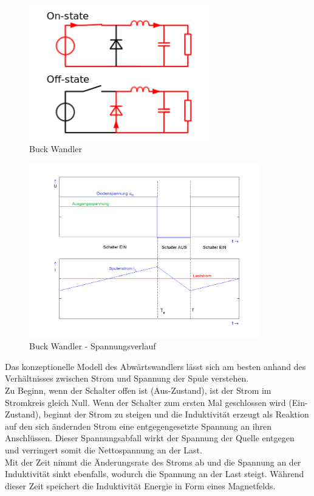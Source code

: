 \begin{figure}[H]
    \centering
    \includegraphics[width=0.7\textwidth]{resources/images/Buck_operating.svg.png}
    \caption[Buck]{Buck Wandler\cite{buck}}
    \label{fig:buck}
\end{figure}

\begin{figure}[H]
    \centering
    \includegraphics[width=0.9\textwidth]{resources/images/Tiefsetzsteller_Funktion.png}
    \caption[Buck Spannungen]{Buck Wandler - Spannungsverlauf\cite{buck2}}
    \label{fig:buck_waveforms}
\end{figure}

Das konzeptionelle Modell des Abwärtswandlers lässt sich am besten anhand des Verhältnisses zwischen Strom
und Spannung der Spule verstehen. \\
Zu Beginn, wenn der Schalter offen ist (Aus-Zustand), ist der Strom im
Stromkreis gleich Null. Wenn der Schalter zum ersten Mal geschlossen wird (Ein-Zustand), beginnt der Strom
zu steigen und die Induktivität erzeugt als Reaktion auf den sich ändernden Strom eine entgegengesetzte
Spannung an ihren Anschlüssen. Dieser Spannungsabfall wirkt der Spannung der Quelle entgegen und verringert
somit die Nettospannung an der Last. \\
Mit der Zeit nimmt die Änderungsrate des Stroms ab und die Spannung an der Induktivität sinkt ebenfalls,
wodurch die Spannung an der Last steigt. Während dieser Zeit speichert die Induktivität Energie in Form
eines Magnetfelds.

